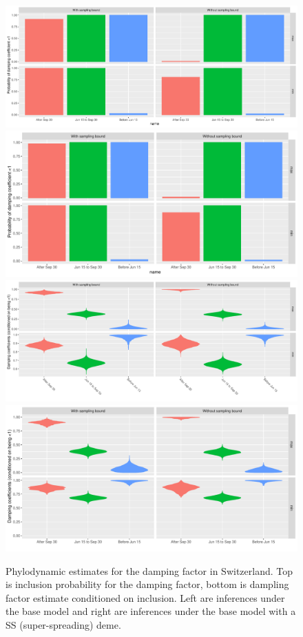 \documentclass[9pt,twoside,lineno]{pnas-new}
\begin{document}
\begin{figure}[tbhp]
\centering
\includegraphics[width=\linewidth]{figures/bdsky_2021-08-18/CT_dampingProbs_CHE_1deme.pdf}
\includegraphics[width=0.4\linewidth]{figures/bdsky_2021-08-18/CT_dampingProbs_2deme.pdf}
\includegraphics[width=0.4\linewidth]{figures/bdsky_2021-08-18/CT_conditionedDamping_CHE_1deme.pdf}
\includegraphics[width=0.4\linewidth]{figures/bdsky_2021-08-18/CT_conditionedDamping_2deme.pdf}
\caption{Phylodynamic estimates for the damping factor in Switzerland. Top is inclusion probability for the damping factor, bottom is dampling factor estimate conditioned on inclusion. Left are inferences under the base model and right are inferences under the base model with a SS (super-spreading) deme.}  
\label{fig:1vs2demeDampingFactorResults}
\end{figure}
\newpage
\end{document}

